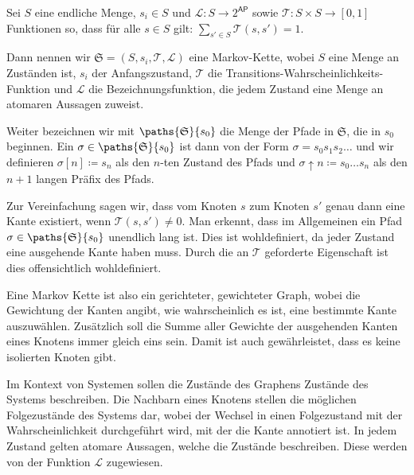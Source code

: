 \begin{definition}
	Sei $S$ eine endliche Menge, $s_i\in S$ und $\mathcal{L}:S\to 2^\mathsf{AP}$ sowie $\mathcal{T}:S\times S \to [0,1]$ Funktionen so, dass für alle $s\in S$ gilt: $\sum_{s'\in S}\mathcal{T}(s,s')=1$.
	
	Dann nennen wir $\mathfrak{S}=(S, s_i, \mathcal{T}, \mathcal{L})$ eine Markov-Kette, wobei $S$ eine Menge an Zuständen ist, $s_i$ der Anfangszustand, $\mathcal{T}$ die Transitions-Wahrscheinlichkeits-Funktion und $\mathcal{L}$ die Bezeichnungsfunktion, die jedem Zustand eine Menge an atomaren Aussagen zuweist.
	
	Weiter bezeichnen wir mit $\paths{\mathfrak{S}}{s_0}$ die Menge der Pfade in $\mathfrak{S}$, die in $s_0$ beginnen. 
	Ein $\sigma\in \paths{\mathfrak{S}}{s_0}$ ist dann von der Form $\sigma=s_0s_1s_2\dots$ und wir definieren $\sigma[n]\coloneqq s_n$ als den $n$-ten Zustand des Pfads und $\sigma\uparrow n\coloneqq s_0\dots s_n$ als den $n+1$ langen Präfix des Pfads.
	\cite{hansson1994logic}
\end{definition}

Zur Vereinfachung sagen wir, dass vom Knoten $s$ zum Knoten $s'$ genau dann eine Kante existiert, wenn $\mathcal{T}(s, s') \neq 0$.
Man erkennt, dass im Allgemeinen ein Pfad $\sigma\in \paths{\mathfrak{S}}{s_0}$ unendlich lang ist. 
Dies ist wohldefiniert, da jeder Zustand eine ausgehende Kante haben muss. Durch die an $\mathcal{T}$ geforderte Eigenschaft ist dies offensichtlich wohldefiniert.

Eine Markov Kette ist also ein gerichteter, gewichteter Graph, wobei die Gewichtung der Kanten angibt, wie wahrscheinlich es ist, eine bestimmte Kante auszuwählen. Zusätzlich soll die Summe aller Gewichte der ausgehenden Kanten eines Knotens immer gleich eins sein. Damit ist auch gewährleistet, dass es keine isolierten Knoten gibt.

Im Kontext von Systemen sollen die Zustände des Graphens Zustände des Systems beschreiben. 
Die Nachbarn eines Knotens stellen die möglichen Folgezustände des Systems dar, wobei der Wechsel in einen Folgezustand mit der Wahrscheinlichkeit durchgeführt wird, mit der die Kante annotiert ist. 
In jedem Zustand gelten atomare Aussagen, welche die Zustände beschreiben.
Diese werden von der Funktion $\mathcal{L}$ zugewiesen.

